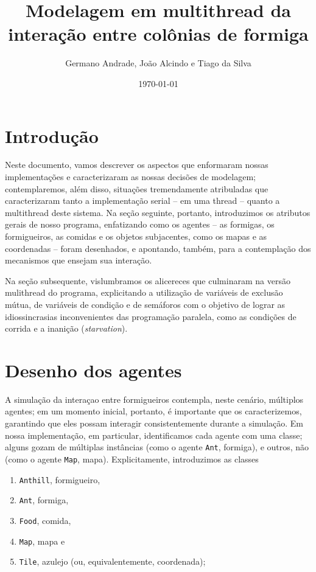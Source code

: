 \documentclass[12pt]{article}
\title{Modelagem em multithread da interação entre colônias de formiga}
\author{Germano Andrade, João Alcindo e Tiago da Silva}
\date{\today}
\theoremstyle{definition}
\begin{document}
  
	 
\maketitle  
\tableofcontents 

\section{Introdução} 

Neste documento, vamos descrever os aspectos que enformaram nossas implementações e caracterizaram as nossas decisões de modelagem; contemplaremos, além disso, situações tremendamente atribuladas que caracterizaram tanto a implementação serial -- em uma thread -- quanto a multithread deste sistema. Na seção seguinte, portanto, introduzimos os atributos gerais de nosso programa, enfatizando como os agentes -- as formigas, os formigueiros, as comidas e os objetos subjacentes, como os mapas e as coordenadas -- foram desenhados, e apontando, também, para a contemplação dos mecanismos que ensejam sua interação. 

Na seção subsequente, vislumbramos os alicereces que culminaram na versão mulithread do programa, explicitando a utilização de variáveis de exclusão mútua, de variáveis de condição e de semáforos com o objetivo de lograr as idiossincrasias inconvenientes das programação paralela, como as condições de corrida e a inanição (\textit{starvation}). 

\section{Desenho dos agentes} 

A simulação da interaçao entre formigueiros contempla, neste cenário, múltiplos agentes; em um momento inicial, portanto, é importante que os caracterizemos, garantindo que eles possam interagir consistentemente durante a simulação. Em nossa implementação, em particular, identificamos cada agente com uma classe; alguns gozam de múltiplas instâncias (como o agente \texttt{Ant}, formiga), e outros, não (como o agente \texttt{Map}, mapa). Explicitamente, introduzimos as classes 

\begin{enumerate} 
	\item \texttt{Anthill}, formigueiro, 
	\item \texttt{Ant}, formiga, 
	\item \texttt{Food}, comida, 
	\item \texttt{Map}, mapa e 
	\item \texttt{Tile}, azulejo (ou, equivalentemente, coordenada); 
\end{enumerate} 
\end{document}
